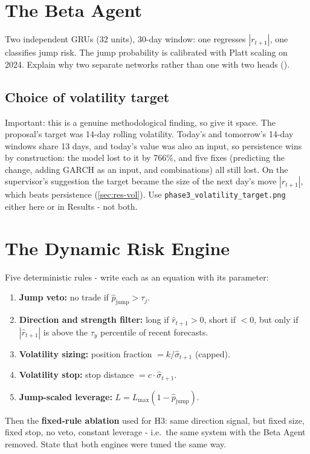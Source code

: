 \section{The Beta Agent}\label{sec:beta}
\begin{guide}
Two independent GRUs (32 units), 30-day window: one regresses $|r_{t+1}|$, one classifies jump risk. The jump probability is calibrated with Platt scaling on 2024. Explain why two separate networks rather than one with two heads ().
\end{guide}
\tbc{}

\subsection{Choice of volatility target}\label{sec:vol-target}
\begin{guide}
Important: this is a genuine methodological finding, so give it space. The proposal's target was 14-day rolling volatility. Today's and tomorrow's 14-day windows share 13 days, and today's value was also an input, so persistence wins by construction: the model lost to it by 766\%, and five fixes (predicting the change, adding GARCH as an input, and combinations) all still lost. On the supervisor's suggestion the target became the size of the next day's move $|r_{t+1}|$, which beats persistence (\cref{sec:res-vol}). Use \texttt{phase3\_volatility\_target.png} either here or in Results - not both.
\end{guide}
\tbc{}

\section{The Dynamic Risk Engine}\label{sec:risk-engine}
\begin{guide}
Five deterministic rules - write each as an equation with its parameter:
\begin{enumerate}
  \item \textbf{Jump veto:} no trade if $\hat p_{\text{jump}} > \tau_j$.
  \item \textbf{Direction and strength filter:} long if $\hat r_{t+1} > 0$, short if $< 0$, but only if $|\hat r_{t+1}|$ is above the $\tau_y$ percentile of recent forecasts.
  \item \textbf{Volatility sizing:} position fraction $= k / \hat\sigma_{t+1}$ (capped).
  \item \textbf{Volatility stop:} stop distance $= c \cdot \hat\sigma_{t+1}$.
  \item \textbf{Jump-scaled leverage:} $L = L_{\max}(1 - \hat p_{\text{jump}})$.
\end{enumerate}
Then the \textbf{fixed-rule ablation} used for H3: same direction signal, but fixed size, fixed stop, no veto, constant leverage - i.e.\ the same system with the Beta Agent removed. State that both engines were tuned the same way.
\end{guide}
\tbc{}

